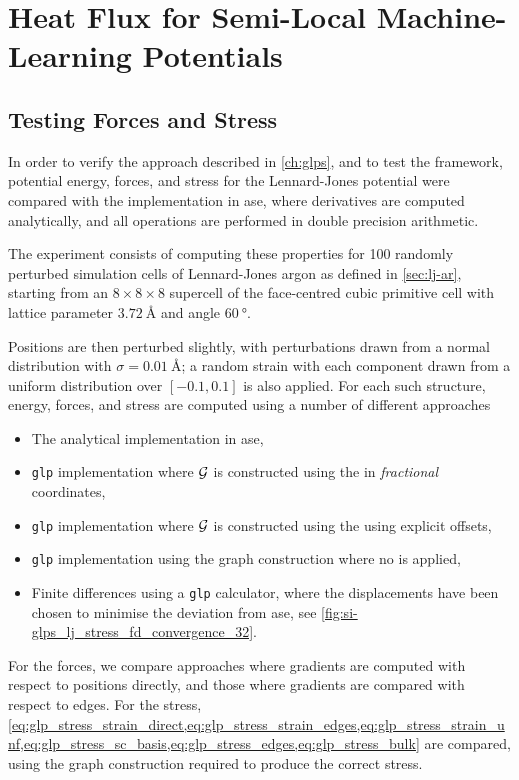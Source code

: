 
\chapter{Heat Flux for Semi-Local Machine-Learning Potentials}
\label{ch:si-heat_flux}


\section{Testing Forces and Stress}
\label{sec:si-glp_testing}

In order to verify the approach described in \cref{ch:glps}, and to test the \glpc framework, potential energy, forces, and stress for the Lennard-Jones potential were compared with the implementation in \gls{ase}, where derivatives are computed analytically, and all operations are performed in double precision arithmetic.

The experiment consists of computing these properties for \num{100} randomly perturbed simulation cells of Lennard-Jones argon as defined in \cref{sec:lj-ar}, starting from an $8\times8\times8$ supercell of the face-centred cubic primitive cell with lattice parameter $\qty{3.72}{\angstrom}$ and angle $\qty{60}{\degree}$.

Positions are then perturbed slightly, with perturbations drawn from a normal distribution with $\sigma{=}\qty{0.01}{\angstrom}$; a random strain with each component drawn from a uniform distribution over $[-0.1, 0.1]$ is also applied.
For each such structure, energy, forces, and stress are computed using a number of different approaches
\begin{itemize}[itemsep=0pt,topsep=0.5\baselineskip]
	\item The analytical implementation in \gls{ase},
	\item \texttt{glp} implementation where $\mathcal{G}$ is constructed using the \mic in \emph{fractional} coordinates,
	\item \texttt{glp} implementation where $\mathcal{G}$ is constructed using the \mic using explicit offsets,
	\item \texttt{glp} implementation using the  graph construction where no \mic is applied,
	\item Finite differences using a \texttt{glp} calculator, where the displacements have been chosen to minimise the deviation from \gls{ase}, see \cref{fig:si-glps_lj_stress_fd_convergence_32}.
\end{itemize}
For the forces, we compare approaches where gradients are computed with respect to positions directly, and those where gradients are compared with respect to edges.
For the stress, \cref{eq:glp_stress_strain_direct,eq:glp_stress_strain_edges,eq:glp_stress_strain_unf,eq:glp_stress_sc_basis,eq:glp_stress_edges,eq:glp_stress_bulk} are compared, using the graph construction required to produce the correct stress.

